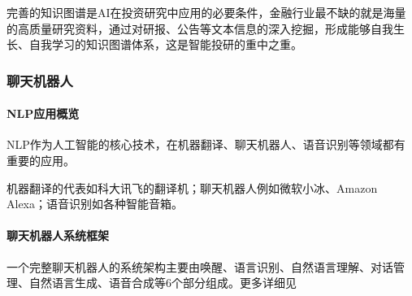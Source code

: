 \documentclass[letterpaper,10pt,english]{sphinxmanual}
\begin{document}
完善的知识图谱是AI在投资研究中应用的必要条件，金融行业最不缺的就是海量的高质量研究资料，通过对研报、公告等文本信息的深入挖掘，形成能够自我生长、自我学习的知识图谱体系，这是智能投研的重中之重。%
\begin{footnote}[960]\sphinxAtStartFootnote
{}
%
\end{footnote}


\subsubsection{聊天机器人}
\label{\detokenize{chapter_AI_dive/chatbot:id1}}\label{\detokenize{chapter_AI_dive/chatbot::doc}}

\paragraph{NLP应用概览}
\label{\detokenize{chapter_AI_dive/chatbot:nlp}}
NLP作为人工智能的核心技术，在机器翻译、聊天机器人、语音识别等领域都有重要的应用。

机器翻译的代表如科大讯飞的翻译机；聊天机器人例如微软小冰、Amazon
Alexa；语音识别如各种智能音箱。


\paragraph{聊天机器人系统框架}
\label{\detokenize{chapter_AI_dive/chatbot:id2}}
一个完整聊天机器人的系统架构主要由唤醒、语言识别、自然语言理解、对话管理、自然语言生成、语音合成等6个部分组成。更多详细见%
\begin{footnote}[961]\sphinxAtStartFootnote
{}
%
\end{footnote}
\end{document}
